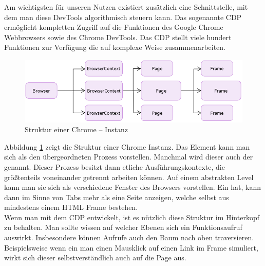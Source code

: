 Am wichtigsten für unseren Nutzen existiert zusätzlich eine Schnittstelle, mit dem man diese DevTools algorithmisch steuern kann. Das sogenannte \ac{CDP} ermöglicht kompletten Zugriff auf die Funktionen des Google Chrome Webbrowsers sowie des Chrome DevTools. Das \ac{CDP} stellt viele hundert Funktionen zur Verfügung die auf komplexe Weise zusammenarbeiten. \cite{cdpexplorer} 

\begin{figure}[h]
	\centering
	\includegraphics[]{images/cdp_overview.png}
	\caption{Struktur einer Chrome – Instanz}
	\label{scraper:image:cdptree}
\end{figure}
Abbildung \ref{scraper:image:cdptree} zeigt die Struktur einer Chrome Instanz. Das  Element kann man sich als den übergeordneten Prozess vorstellen. Manchmal wird dieser auch der  genannt. Dieser Prozess besitzt dann etliche Ausführungskontexte, die größtenteils voneinander getrennt arbeiten können. Auf einem abstrakten Level kann man sie sich als verschiedene Fenster des Browsers vorstellen. Ein  hat, kann dann im Sinne von Tabs mehr als eine Seite anzeigen, welche selbst aus mindestens einem HTML Frame bestehen. \\
Wenn man mit dem \ac{CDP} entwickelt, ist es nützlich diese Struktur im Hinterkopf zu behalten. Man sollte wissen auf welcher Ebenen sich ein Funktionsaufruf auswirkt. Insbesondere können Aufrufe auch den Baum nach oben traversieren. Beispielsweise wenn ein man einen Mausklick auf einen Link im Frame simuliert, wirkt sich dieser selbstverständlich auch auf die Page aus.



